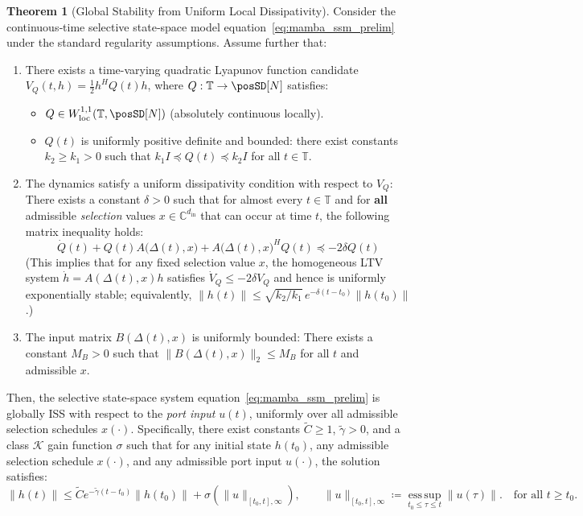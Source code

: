 \documentclass[10pt]{article} %
\def\eqref#1{equation~\ref{#1}}
\newcommand{\timeInt}{\mathbb T}                        %
\newcommand{\loc}{\mathrm{loc}}                         %
\theoremstyle{definition}
\newtheorem{theorem}{Theorem}[section]
\begin{document}
\begin{theorem}[Global Stability from Uniform Local Dissipativity]
\label{thm:stability_from_local_passivity} %
Consider the continuous‐time selective state‐space model \eqref{eq:mamba_ssm_prelim} under the standard regularity assumptions. Assume further that:
\begin{enumerate}[label=(\roman*)]
    \item There exists a time-varying quadratic Lyapunov function candidate $V_Q(t,h) = \frac{1}{2} h^H Q(t) h$, where $Q: \timeInt \to \posSD[N]$ satisfies:
        \begin{itemize}
            \item $Q \in W^{1,1}_{\loc}(\timeInt, \posSD[N])$ (absolutely continuous locally).
            \item $Q(t)$ is uniformly positive definite and bounded: there exist constants $k_2 \ge k_1 > 0$ such that $k_1 I \preceq Q(t) \preceq k_2 I$ for all $t \in \timeInt$.
        \end{itemize}
    \item The dynamics satisfy a uniform dissipativity condition with respect to $V_Q$: There exists a constant $\delta > 0$ such that for almost every $t \in \timeInt$ and for \textbf{all} admissible \emph{selection} values $x \in \mathbb{C}^{d_{\mathrm{in}}}$ that can occur at time $t$, the following matrix inequality holds:
        \begin{equation} \label{eq:uniform_lyapunov_inequality_sec5} %
        \dot{Q}(t) + Q(t)A\bigl(\Delta(t),x\bigr) + A\bigl(\Delta(t),x\bigr)^H Q(t) \preceq -2\delta Q(t)
        \end{equation}
        (This implies that for any fixed selection value $x$, the homogeneous LTV system
$\dot{h} = A(\Delta(t),x)h$ satisfies $\dot V_Q \le -2\delta V_Q$ and hence is uniformly exponentially stable;
equivalently, $\|h(t)\|\le \sqrt{k_2/k_1}\,e^{-\delta(t-t_0)}\|h(t_0)\|$.)
    \item The input matrix $B(\Delta(t),x)$ is uniformly bounded: There exists a constant $M_B > 0$ such that $\|B(\Delta(t),x)\|_2 \le M_B$ for all $t$ and admissible $x$.
\end{enumerate}
Then, the selective state-space system \eqref{eq:mamba_ssm_prelim} is globally ISS with respect to the \emph{port input} $u(t)$, uniformly over all admissible selection schedules $x(\cdot)$. Specifically, there exist constants $\tilde{C} \ge 1$, $\tilde{\gamma} > 0$, and a class $\mathcal{K}$ gain function $\sigma$ such that for any initial state $h(t_0)$, any admissible selection schedule $x(\cdot)$, and any admissible port input $u(\cdot)$, the solution satisfies:
\begin{equation} \label{eq:iss_conclusion_sec5} %
\|h(t)\| \le \tilde{C} e^{-\tilde{\gamma} (t-t_0)} \|h(t_0)\| + \sigma\left( \|u\|_{[t_0,t],\infty} \right),
\qquad
\|u\|_{[t_0,t],\infty}\coloneqq \operatorname*{ess\,sup}_{t_0 \le \tau \le t}\|u(\tau)\|. \quad \text{for all } t \ge t_0.
\end{equation}
\end{theorem}
\end{document}
